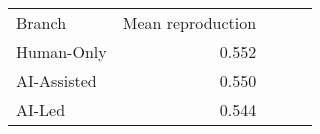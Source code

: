 \begin{tabular}{lrrrr}
\hline\hline
Branch & Mean reproduction \\
Human-Only & 0.552 \\
AI-Assisted & 0.550 \\
AI-Led & 0.544 \\
\hline\hline
\end{tabular}
